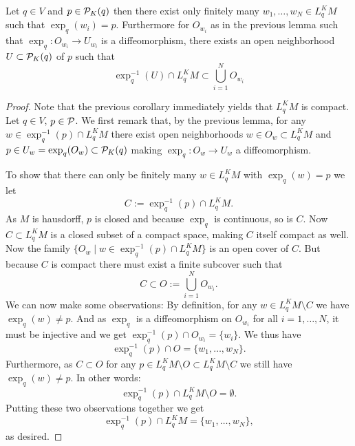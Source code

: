 \begin{lemma}\label{lem:finitevecs}
    Let $q\in V$ and $p\in {\mathcal{P}}_K(q)$ then there exist only finitely many $w_1,\dots,w_N\in L^K_qM$ such that $\exp_q(w_i)=p$. Furthermore for $O_{w_i}$ as in the previous lemma such that $\exp_q:O_{w_i}\to U_{w_i}$ is a diffeomorphism, there exists an open neighborhood $U\subset {\mathcal{P}}_K(q)$ of $p$ such that 
    \[
        \exp^{-1}_{q}(U)\cap L^K_qM \subset \bigcup_{i=1}^N O_{w_i}
    \]
    
\end{lemma}
\begin{proof}
    Note that the previous corollary immediately yields that $L^K_qM$ is compact.
    Let $q\in V$, $p\in {\mathcal{P}}$. We first remark that, by the previous lemma, for any $w\in \exp^{-1}_q(p) \cap L^K_qM$ there exist open neighborhoods $w\in O_w\subset L^K_qM$ and $p\in U_w=\exp_q(O_w)\subset {\mathcal{P}}_K(q)$ making $\exp_q:O_w\to U_w$ a diffeomorphism.

    To show that there can only be finitely many $w\in L^K_qM$ with $\exp_q(w)=p$ we let
    \[
        C:=\exp_q^{-1}(p)\cap L^K_qM.
    \] 
    As $M$ is hausdorff, ${p}$ is closed and because $\exp_q$ is continuous, so is $C$. Now $C\subset L^K_qM$ is a closed subset of a compact space, making $C$ itself compact as well. Now the family $\{O_w \mid w\in \exp^{-1}_q(p)\cap L^K_qM\}$ is an open cover of $C$. But because $C$ is compact there must exist a finite subcover such that 
    \[
        C\subset O:= \bigcup_{i=1}^N O_{w_i}.
    \]
    We can now make some observations: By definition, for any $w\in L^K_qM\setminus C$ we have $\exp_q(w)\neq p$. And as $\exp_q$ is a diffeomorphism on $O_{w_i}$ for all $i=1,\dots, N$, it must be injective and we get $\exp^{-1}_q(p)\cap O_{w_i}=\{w_i\}$. We thus have 
    \[
        \exp_q^{-1}(p) \cap O = \{w_1,\dots, w_N\}.
    \]
    Furthermore, as $C\subset O$ for any $p\in L^K_qM\setminus O \subset L^K_qM \setminus C$ we still have $\exp_q(w)\neq p$. In other words: 
    \[
        \exp_q^{-1}(p)\cap L^K_qM\setminus O=\emptyset.
    \]
    Putting these two observations together we get 
    \[
        \exp_q^{-1}(p)\cap L^K_qM = \{w_1,\dots, w_N\},
    \]
    as desired.


\end{proof}
